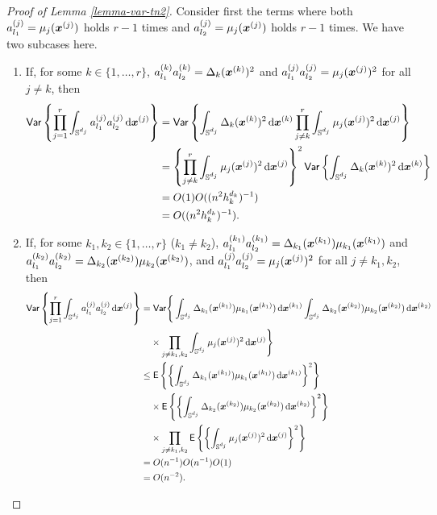 \documentclass[oneside,11pt]{article}
\begin{document}
\begin{proof}[Proof of Lemma \ref{lemma-var-tn2}]
Consider first the terms where both $a_{l_1}^{(j)} = \mu_j(\boldsymbol{x}^{(j)})$ holds $r-1$ times and $a_{l_2}^{(j)} = \mu_j(\boldsymbol{x}^{(j)})$ holds $r-1$ times. We have two subcases here.
\begin{enumerate}
    \item If, for some $k \in \{ 1, \dots, r \}$, $a_{l_1}^{(k)} a_{l_2}^{(k)} = \Delta_k(\boldsymbol{x}^{(k)})^2$ and $a_{l_1}^{(j)} a_{l_2}^{(j)} = \mu_j(\boldsymbol{x}^{(j)})^2$ for all $j \ne k$, then
    \begin{align*}
        \mathsf{Var} \left\{\prod_{j=1}^{r} \int_{\mathbb{S}^{d_j}} a_{l_1}^{(j)} a_{l_2}^{(j)} \,\mathrm{d} \boldsymbol{x}^{(j)}\right\} &= \mathsf{Var} \left\{\int_{\mathbb{S}^{d_j}} \Delta_k(\boldsymbol{x}^{(k)})^2 \,\mathrm{d} \boldsymbol{x}^{(k)} \prod_{j \ne k}^{r} \int_{\mathbb{S}^{d_j}} \mu_j(\boldsymbol{x}^{(j)})^2 \,\mathrm{d} \boldsymbol{x}^{(j)}\right\} \\
        &= \left\{\prod_{j \ne k}^{r} \int_{\mathbb{S}^{d_j}} \mu_j(\boldsymbol{x}^{(j)})^2 \,\mathrm{d} \boldsymbol{x}^{(j)}\right\}^2 \mathsf{Var} \left\{\int_{\mathbb{S}^{d_j}} \Delta_k(\boldsymbol{x}^{(k)})^2 \,\mathrm{d} \boldsymbol{x}^{(k)}\right\} \\
        &= O(1) O((n^2 h_k^{d_k})^{-1}) \\
        &= O((n^2 h_k^{d_k})^{-1}).
    \end{align*}
    \item If, for some $k_1,k_2 \in \{ 1, \dots, r \}$ ($k_1 \ne k_2$), $a_{l_1}^{(k_1)} a_{l_2}^{(k_1)} = \Delta_{k_1}(\boldsymbol{x}^{(k_1)}) \mu_{k_1}(\boldsymbol{x}^{(k_1)})$ and $a_{l_1}^{(k_2)} a_{l_2}^{(k_2)} = \Delta_{k_2}(\boldsymbol{x}^{(k_2)}) \mu_{k_2}(\boldsymbol{x}^{(k_2)})$, and $a_{l_1}^{(j)} a_{l_2}^{(j)} = \mu_j(\boldsymbol{x}^{(j)})^2$ for all $j \ne k_1,k_2$, then
    \begin{align*}
        \mathsf{Var} \left\{\prod_{j=1}^{r} \int_{\mathbb{S}^{d_j}} a_{l_1}^{(j)} a_{l_2}^{(j)} \,\mathrm{d} \boldsymbol{x}^{(j)}\right\} =&\;  \mathsf{Var} \Bigg\{\int_{\mathbb{S}^{d_j}} \Delta_{k_1}(\boldsymbol{x}^{(k_1)}) \mu_{k_1}(\boldsymbol{x}^{(k_1)}) \,\mathrm{d} \boldsymbol{x}^{(k_1)} \int_{\mathbb{S}^{d_j}} \Delta_{k_2}(\boldsymbol{x}^{(k_2)}) \mu_{k_2}(\boldsymbol{x}^{(k_2)}) \,\mathrm{d} \boldsymbol{x}^{(k_2)} \\
        &\times \prod_{j \ne k_1,k_2} \int_{\mathbb{S}^{d_j}} \mu_j(\boldsymbol{x}^{(j)})^2 \,\mathrm{d} \boldsymbol{x}^{(j)} \Bigg\} \\
        \le&\; \mathsf{E} \left\{\left\{\int_{\mathbb{S}^{d_j}} \Delta_{k_1}(\boldsymbol{x}^{(k_1)}) \mu_{k_1}(\boldsymbol{x}^{(k_1)}) \,\mathrm{d} \boldsymbol{x}^{(k_1)}\right\}^2\right\} \\
        &\times \mathsf{E} \left\{\left\{\int_{\mathbb{S}^{d_j}} \Delta_{k_2}(\boldsymbol{x}^{(k_2)}) \mu_{k_2}(\boldsymbol{x}^{(k_2)}) \,\mathrm{d} \boldsymbol{x}^{(k_2)}\right\}^2\right\} \\
        &\times \prod_{j \ne k_1,k_2} \mathsf{E} \left\{\left\{\int_{\mathbb{S}^{d_j}} \mu_j(\boldsymbol{x}^{(j)})^2 \,\mathrm{d} \boldsymbol{x}^{(j)}\right\}^2\right\} \\
        =&\; O(n^{-1}) O(n^{-1}) O(1) \\
        =&\; O(n^{-2}).
    \end{align*}
\end{enumerate}


\end{proof}
\end{document}
